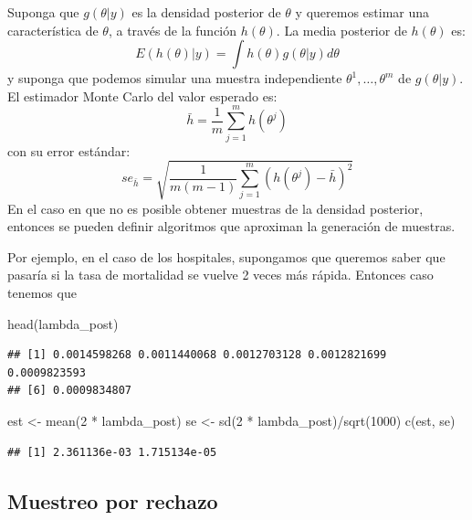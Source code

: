 \documentclass[
  12pt,
]{book}
\newenvironment{Shaded}{\begin{snugshade}}{\end{snugshade}}
\newcommand{\DecValTok}[1]{\textcolor[rgb]{0.00,0.00,0.81}{#1}}
\newcommand{\FunctionTok}[1]{\textcolor[rgb]{0.00,0.00,0.00}{#1}}
\newcommand{\NormalTok}[1]{#1}
\newcommand{\OtherTok}[1]{\textcolor[rgb]{0.56,0.35,0.01}{#1}}
\newcommand{\SpecialCharTok}[1]{\textcolor[rgb]{0.00,0.00,0.00}{#1}}
\theoremstyle{definition}
\theoremstyle{definition}
\theoremstyle{definition}
\theoremstyle{definition}
\theoremstyle{remark}
\begin{document}
Suponga que \(g(\theta|y)\) es la densidad posterior de \(\theta\) y queremos estimar una característica de \(\theta\), a través de la función \(h(\theta)\). La media posterior de \(h(\theta)\) es:
\[E(h(\theta)|y)=\int h(\theta)g(\theta|y)d\theta\]
y suponga que podemos simular una muestra independiente \(\theta^1,\ldots,\theta^m\) de \(g(\theta|y)\). El estimador Monte Carlo del valor esperado es:
\[\bar h =\frac 1 m\sum_{j=1}^mh(\theta^j) \]
con su error estándar:
\[se_{\bar h}=\sqrt{\frac{1}{m(m-1)}\sum_{j=1}^m\left(h(\theta^j)-\bar h\right)^2}\]
En el caso en que no es posible obtener muestras de la densidad posterior, entonces se pueden definir algoritmos que aproximan la generación de muestras.

Por ejemplo, en el caso de los hospitales, supongamos que queremos saber que pasaría si la tasa de mortalidad se vuelve 2 veces más rápida. Entonces caso tenemos que

\begin{Shaded}
\begin{Highlighting}[]
\FunctionTok{head}\NormalTok{(lambda\_post)}
\end{Highlighting}
\end{Shaded}

\begin{verbatim}
## [1] 0.0014598268 0.0011440068 0.0012703128 0.0012821699 0.0009823593
## [6] 0.0009834807
\end{verbatim}

\begin{Shaded}
\begin{Highlighting}[]
\NormalTok{est }\OtherTok{\textless{}{-}} \FunctionTok{mean}\NormalTok{(}\DecValTok{2} \SpecialCharTok{*}\NormalTok{ lambda\_post)}
\NormalTok{se }\OtherTok{\textless{}{-}} \FunctionTok{sd}\NormalTok{(}\DecValTok{2} \SpecialCharTok{*}\NormalTok{ lambda\_post)}\SpecialCharTok{/}\FunctionTok{sqrt}\NormalTok{(}\DecValTok{1000}\NormalTok{)}
\FunctionTok{c}\NormalTok{(est, se)}
\end{Highlighting}
\end{Shaded}

\begin{verbatim}
## [1] 2.361136e-03 1.715134e-05
\end{verbatim}

\hypertarget{muestreo-por-rechazo}{%
\subsection{Muestreo por rechazo}\label{muestreo-por-rechazo}}
\end{document}
